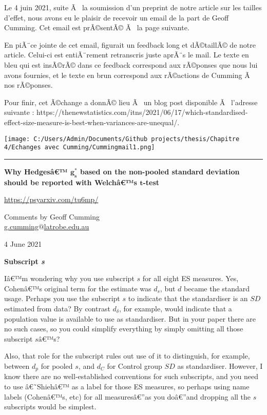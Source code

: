 \begin{appendix}
Le 4 juin 2021, suite Ã~ la soumission d'un preprint de notre article
sur les tailles d'effet, nous avons eu le plaisir de recevoir un email
de la part de Geoff Cumming. Cet email est prÃ©sentÃ© Ã~ la page
suivante.

En piÃ¨ce jointe de cet email, figurait un feedback long et dÃ©taillÃ©
de notre article. Celui-ci est entiÃ¨rement retranscris juste aprÃ¨s le
mail. Le texte en bleu qui est insÃ©rÃ© dans ce feedback correspond aux
rÃ©ponses que nous lui avons fournies, et le texte en brun correspond
aux rÃ©actions de Cumming Ã~ nos rÃ©ponses.

Pour finir, cet Ã©change a donnÃ© lieu Ã~ un blog post disponible Ã~
l'adresse suivante :
https://thenewstatistics.com/itns/2021/06/17/which-standardised-effect-size-measure-is-best-when-variances-are-unequal/.

\texttt{[image: C:/Users/Admin/Documents/Github projects/thesis/Chapitre 4/Echanges avec Cumming/Cummingmail1.png]}
\newpage

\begin{center}\rule{0.5\linewidth}{0.5pt}\end{center}

\color{black}\textbf{Why Hedgesâ€™ \(\bm{g_s^*}\) based on the
non-pooled standard deviation should be reported with Welchâ€™s
\(\bm{t}\)-test}

\underline{https://psyarxiv.com/tu6mp/}

Comments by Geoff Cumming\\
\underline{g.cumming$@$latrobe.edu.au}

4 June 2021

\textbf{Subscript \emph{s}}

Iâ€™m wondering why you use subscript \(s\) for all eight ES measures.
Yes, Cohenâ€™s original term for the estimate was \(d_s\), but \(d\)
became the standard usage. Perhaps you use the subscript \(s\) to
indicate that the standardiser is an \(SD\) estimated from data? By
contrast \(d_\delta\), for example, would indicate that a population
value is available to use as standardiser. But in your paper there are
no such cases, so you could simplify everything by simply omitting all
those subscript \(sâ€™\)s?

Also, that role for the subscript rules out use of it to distinguish,
for example, between \(d_p\) for pooled \(s\), and \(d_C\) for Control
group \(SD\) as standardiser. However, I know there are no
well-established conventions for such subscripts, and you need to use
â€˜Shiehâ€™ as a label for those ES measures, so perhaps using name
labels (Cohenâ€™s, etc) for all measuresâ€''as you doâ€''and dropping
all the \(s\) subscripts would be simplest.


\end{appendix}
